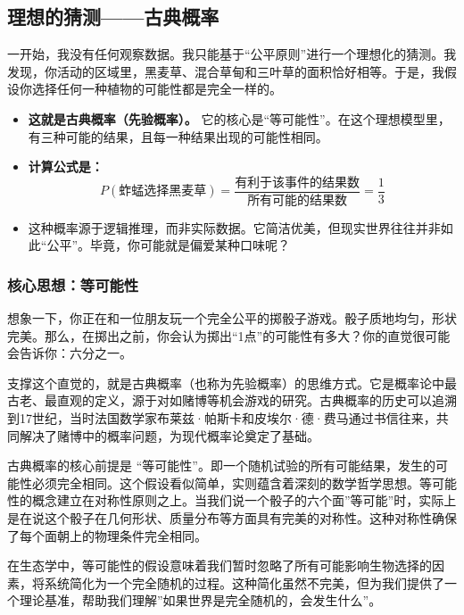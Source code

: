 \documentclass[
  twoside]{book}
\providecommand{\tightlist}{%
  \setlength{\itemsep}{0pt}\setlength{\parskip}{0pt}}
\begin{document}
\hypertarget{ux7406ux60f3ux7684ux731cux6d4bux53e4ux5178ux6982ux7387}{%
\subsection{理想的猜测------古典概率}\label{ux7406ux60f3ux7684ux731cux6d4bux53e4ux5178ux6982ux7387}}

一开始，我没有任何观察数据。我只能基于``公平原则''进行一个理想化的猜测。我发现，你活动的区域里，黑麦草、混合草甸和三叶草的面积恰好相等。于是，我假设你选择任何一种植物的可能性都是完全一样的。

\begin{itemize}
\tightlist
\item
  \textbf{这就是古典概率（先验概率）。} 它的核心是``等可能性''。在这个理想模型里，有三种可能的结果，且每一种结果出现的可能性相同。
\item
  \textbf{计算公式是：} \[P(\text{蚱蜢选择黑麦草}) = \frac{\text{有利于该事件的结果数}}{\text{所有可能的结果数}} = \frac{1}{3}\]
\item
  这种概率源于逻辑推理，而非实际数据。它简洁优美，但现实世界往往并非如此``公平''。毕竟，你可能就是偏爱某种口味呢？
\end{itemize}

\hypertarget{ux6838ux5fc3ux601dux60f3ux7b49ux53efux80fdux6027}{%
\subsubsection{核心思想：等可能性}\label{ux6838ux5fc3ux601dux60f3ux7b49ux53efux80fdux6027}}

想象一下，你正在和一位朋友玩一个完全公平的掷骰子游戏。骰子质地均匀，形状完美。那么，在掷出之前，你会认为掷出``1点''的可能性有多大？你的直觉很可能会告诉你：六分之一。

支撑这个直觉的，就是古典概率（也称为先验概率）的思维方式。它是概率论中最古老、最直观的定义，源于对如赌博等机会游戏的研究。古典概率的历史可以追溯到17世纪，当时法国数学家布莱兹·帕斯卡和皮埃尔·德·费马通过书信往来，共同解决了赌博中的概率问题，为现代概率论奠定了基础。

古典概率的核心前提是 ``等可能性''。即一个随机试验的所有可能结果，发生的可能性必须完全相同。这个假设看似简单，实则蕴含着深刻的数学哲学思想。等可能性的概念建立在对称性原则之上。当我们说一个骰子的六个面''等可能''时，实际上是在说这个骰子在几何形状、质量分布等方面具有完美的对称性。这种对称性确保了每个面朝上的物理条件完全相同。

在生态学中，等可能性的假设意味着我们暂时忽略了所有可能影响生物选择的因素，将系统简化为一个完全随机的过程。这种简化虽然不完美，但为我们提供了一个理论基准，帮助我们理解''如果世界是完全随机的，会发生什么''。
\end{document}

